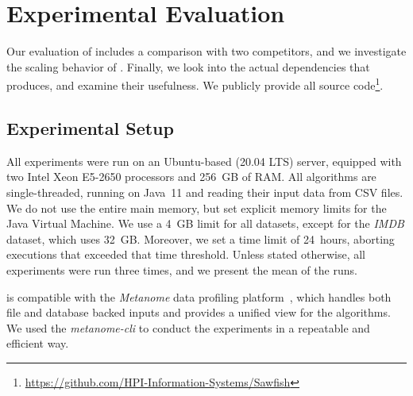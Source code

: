 \section{Experimental Evaluation}
\label{section:evaluation}
Our evaluation of \sawfish includes a comparison with two competitors, and we investigate the scaling behavior of \sawfish.
Finally, we look into the actual dependencies that \sawfish produces, and examine their usefulness. We publicly provide all source code\footnote{\url{https://github.com/HPI-Information-Systems/Sawfish}}.

\subsection{Experimental Setup}
All experiments were run on an Ubuntu-based (20.04 LTS) server, equipped with two Intel Xeon E5-2650 processors and 256~GB of RAM\@.
All algorithms are single-threaded, running on Java~11 and reading their input data from CSV files.
We do not use the entire main memory, but set explicit memory limits for the Java Virtual Machine.
We use a 4~GB limit for all datasets, except for the \emph{IMDB} dataset, which uses 32~GB.
Moreover, we set a time limit of 24~hours, aborting executions that exceeded that time threshold. 
Unless stated otherwise, all experiments were run three times, and we present the mean of the runs.

\sawfish is compatible with the \emph{Metanome} data profiling platform~\cite{papenbrock2015metanome},
which handles both file and database backed inputs and provides a unified view for the algorithms.
We used the \emph{metanome-cli} to conduct the experiments in a repeatable and efficient way. 


